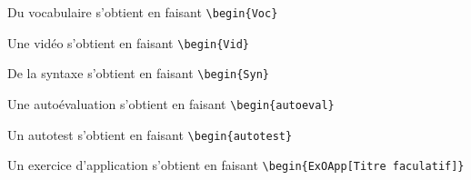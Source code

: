 \documentclass[a4paper,dvipsnames]{article}
\begin{document}
\begin{Voc}
Du vocabulaire s'obtient en faisant \verb|\begin{Voc}|
\end{Voc}

\begin{Vid}
Une vidéo s'obtient en faisant \verb|\begin{Vid}|
\end{Vid}

\begin{Syn}
De la syntaxe s'obtient en faisant \verb|\begin{Syn}|
\end{Syn}

\begin{autoeval}
Une autoévaluation s'obtient en faisant \verb|\begin{autoeval}|
\end{autoeval}

\begin{autotest}
Un autotest s'obtient en faisant \verb|\begin{autotest}|
\end{autotest}

\begin{ExOApp}[]
Un exercice d'application s'obtient en faisant \verb|\begin{ExOApp[Titre faculatif]}|
\end{ExOApp}
\end{document}
